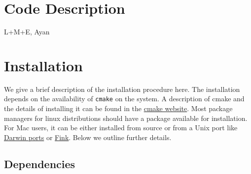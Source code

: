 \documentclass[preprint,3p,12pt]{elsarticle}
\begin{document}
\section{Code Description}
\label{sec:Code}

L+M+E, Ayan


\newpage

\section{Installation}
\label{sec:Installation}

We give a brief description of the installation procedure here. The installation depends on the availability of \texttt{cmake} on the system. A description of cmake and the details of installing it can be found in the \href{https://cmake.org/}{cmake website}. Most package managers for linux distributions should have a package available for installation. For Mac users, it can be either installed from source or from a Unix port like \href{https://www.macports.org/}{Darwin ports} or \href{http://www.finkproject.org/}{Fink}. Below we outline further details. 

\subsection{Dependencies}
\end{document}
